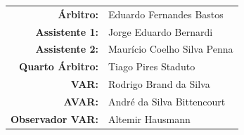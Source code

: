 \documentclass[11pt]{article}
\begin{document}
\vspace{0.5cm}
\begin{minipage}{0.65\textwidth}
\begin{center}
\begin{tabular}{rl}
\textbf{Árbitro:} & Eduardo Fernandes Bastos \\
\textbf{Assistente 1:} & Jorge Eduardo Bernardi \\
\textbf{Assistente 2:} & Maurício Coelho Silva Penna \\
\textbf{Quarto Árbitro:} & Tiago Pires Staduto \\
\textbf{VAR:} & Rodrigo Brand da Silva \\
\textbf{AVAR:} & André da Silva Bittencourt \\
\textbf{Observador VAR:} & Altemir Hausmann \\
\end{tabular}
\end{center}
\end{minipage}
\begin{minipage}{0.3\textwidth}
\end{minipage}
\newpage
\end{document}
